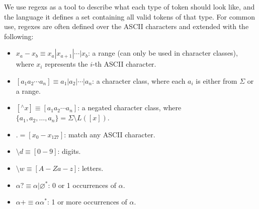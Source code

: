 \documentclass[titlepage]{article}
\theoremstyle{plain}
\theoremstyle{definition}
\theoremstyle{remark}
\begin{document}
We use regexs as a tool to describe what each type of token should look like,
and the language it defines a set containing all valid tokens of that type.
For common use, regexes are often defined over the ASCII characters and extended
with the following:
\begin{itemize}
  \item $x_a-x_b\equiv x_a|x_{a+1}|\cdots|x_b$: a range (can only be used in character
    classes), where $x_i$ represents the $i$-th ASCII character.
  \item $[a_1a_2\cdots a_n]\equiv a_1|a_2|\cdots|a_n$: a character class, where
    each $a_i$ is either from $\Sigma$ or a range.
  \item $[{}^\wedge x]\equiv [a_1a_2\cdots a_n]$: a negated character class, where
    $\{a_1,a_2,\ldots,a_n\}=\Sigma\setminus L([x])$.
  \item $.=[x_0-x_{127}]$: match any ASCII character.
  \item $\text{\textbackslash}d\equiv [0-9]$: digits.
  \item $\text{\textbackslash}w\equiv [A-Za-z]$: letters.
  \item $\alpha?\equiv \alpha|\varnothing^*$: 0 or 1 occurrences of $\alpha$.
  \item $\alpha+\equiv \alpha\alpha^*$: 1 or more occurrences of $\alpha$.
\end{itemize}
\end{document}
